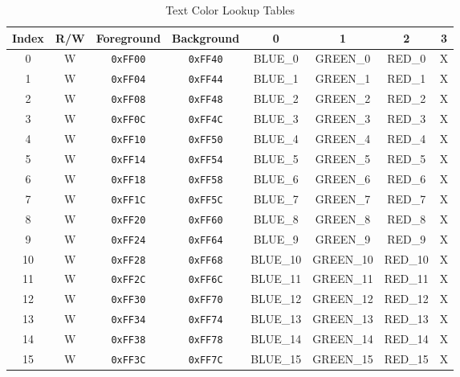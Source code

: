 \begin{table}[ht]
    \begin{center}
        \begin{tabular}{|c|c|c|c|c|c|c|c|} \hline
            Index & R/W & Foreground & Background & 0 & 1 & 2 & 3 \\ \hline\hline
            0 & W & \verb+0xFF00+ & \verb+0xFF40+ & BLUE\_0 & GREEN\_0 & RED\_0 & X \\ \hline
            1 & W & \verb+0xFF04+ & \verb+0xFF44+ & BLUE\_1 & GREEN\_1 & RED\_1 & X \\ \hline
            2 & W & \verb+0xFF08+ & \verb+0xFF48+ & BLUE\_2 & GREEN\_2 & RED\_2 & X \\ \hline
            3 & W & \verb+0xFF0C+ & \verb+0xFF4C+ & BLUE\_3 & GREEN\_3 & RED\_3 & X \\ \hline
            4 & W & \verb+0xFF10+ & \verb+0xFF50+ & BLUE\_4 & GREEN\_4 & RED\_4 & X \\ \hline
            5 & W & \verb+0xFF14+ & \verb+0xFF54+ & BLUE\_5 & GREEN\_5 & RED\_5 & X \\ \hline
            6 & W & \verb+0xFF18+ & \verb+0xFF58+ & BLUE\_6 & GREEN\_6 & RED\_6 & X \\ \hline
            7 & W & \verb+0xFF1C+ & \verb+0xFF5C+ & BLUE\_7 & GREEN\_7 & RED\_7 & X \\ \hline
            8 & W & \verb+0xFF20+ & \verb+0xFF60+ & BLUE\_8 & GREEN\_8 & RED\_8 & X \\ \hline
            9 & W & \verb+0xFF24+ & \verb+0xFF64+ & BLUE\_9 & GREEN\_9 & RED\_9 & X \\ \hline
            10 & W & \verb+0xFF28+ & \verb+0xFF68+ & BLUE\_10 & GREEN\_10 & RED\_10 & X \\ \hline
            11 & W & \verb+0xFF2C+ & \verb+0xFF6C+ & BLUE\_11 & GREEN\_11 & RED\_11 & X \\ \hline
            12 & W & \verb+0xFF30+ & \verb+0xFF70+ & BLUE\_12 & GREEN\_12 & RED\_12 & X \\ \hline
            13 & W & \verb+0xFF34+ & \verb+0xFF74+ & BLUE\_13 & GREEN\_13 & RED\_13 & X \\ \hline
            14 & W & \verb+0xFF38+ & \verb+0xFF78+ & BLUE\_14 & GREEN\_14 & RED\_14 & X \\ \hline
            15 & W & \verb+0xFF3C+ & \verb+0xFF7C+ & BLUE\_15 & GREEN\_15 & RED\_15 & X \\ \hline
        \end{tabular}
    \end{center}
    \caption{Text Color Lookup Tables}
    \label{tab:text_luts}
\end{table}

